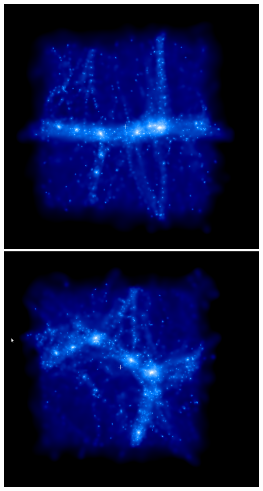 \includegraphics[scale=0.25]{r128/drdx_h100_r128_1/1.png} 
\includegraphics[scale=0.25]{r128/drdx_h100_r128_1/2.png} 


